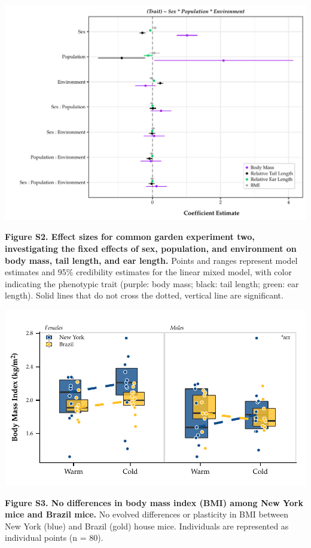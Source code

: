 \documentclass[]{article}
\begin{document}
\includegraphics{../results/figures/RXNsModel_relative.pdf}

\textbf{Figure S2. Effect sizes for common garden experiment two,
investigating the fixed effects of sex, population, and environment on
body mass, tail length, and ear length.} Points and ranges represent
model estimates and 95\% credibility estimates for the linear mixed
model, with color indicating the phenotypic trait (purple: body mass;
black: tail length; green: ear length). Solid lines that do not cross
the dotted, vertical line are significant.

\newpage

\includegraphics{../results/figures/RXNs_BMI.pdf}

\textbf{Figure S3. No differences in body mass index (BMI) among New
York mice and Brazil mice.} No evolved differences or plasticity in BMI
between New York (blue) and Brazil (gold) house mice. Individuals are
represented as individual points (n = 80).
\end{document}
